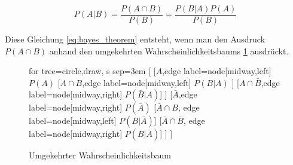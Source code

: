 \begin{equation}
\label{eq:bayes_theorem}
	P(A|B) = \frac{P(A \cap B)}{P(B)} = \frac{P(B|A)P(A)}{P(B)}
\end{equation}

Diese Gleichung \ref{eq:bayes_theorem} entsteht, wenn man den Ausdruck $P(A \cap B)$ anhand den umgekehrten Wahrscheinlichkeitsbaums \ref{fig:inv_probability_tree} ausdrückt. 


\begin{figure}[H]
	\centering
	\label{fig:inv_probability_tree}
	\begin{forest}
	for tree={circle,draw, s sep=3em}
	[ 
	    [$A$,edge label={node[midway,left] {$P(A)$}}
	      [$A \cap B$,edge label={node[midway,left] {$P(B|A)$}} ] 
	      [$A \cap \bar{B}$,edge label={node[midway,right] {$P(\bar{B}|A)$}}] 
	    ]
	    [$\bar{A}$,edge label={node[midway,right] {$P(\bar{A})$}}
	      [$\bar{A} \cap B$, edge label={node[midway,left] {$P(B|\bar{A})$}}] 
	      [$\bar{A} \cap \bar{B}$, edge label={node[midway,right] {$P(\bar{B}| \bar{A})$}}] 
	  ] 
	]
	\end{forest}
	\caption{Umgekehrter Wahrscheinlichkeitsbaum}
\end{figure}


